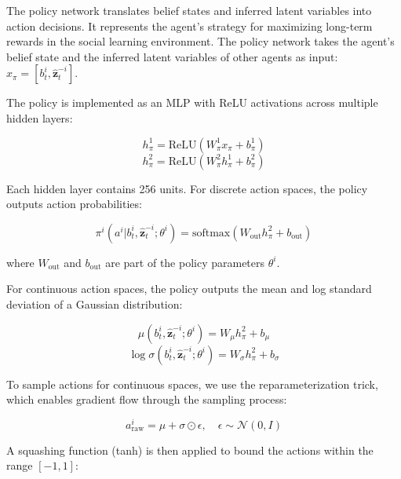 \documentclass[a4paper,12pt]{report}
\begin{document}
The policy network translates belief states and inferred latent variables into action decisions. It represents the agent's strategy for maximizing long-term rewards in the social learning environment. The policy network takes the agent's belief state and the inferred latent variables of other agents as input: $x_{\pi} = [b^{i}_{t}, \hat{\boldsymbol{z}}^{-i}_{t}]$.

The policy is implemented as an MLP with ReLU activations across multiple hidden layers:

\begin{equation}
    h^1_{\pi} = \text{ReLU}(W^1_{\pi}x_{\pi} + b^1_{\pi})
\end{equation}
\begin{equation}
    h^2_{\pi} = \text{ReLU}(W^2_{\pi}h^1_{\pi} + b^2_{\pi})
\end{equation}

Each hidden layer contains 256 units. For discrete action spaces, the policy outputs action probabilities:

\begin{equation}
    \pi^{i}(a^{i}|b^{i}_{t}, \hat{\boldsymbol{z}}^{-i}_{t}; \theta^{i}) = \text{softmax}(W_{\text{out}}h^2_{\pi} + b_{\text{out}})
\end{equation}

where $W_{\text{out}}$ and $b_{\text{out}}$ are part of the policy parameters $\theta^{i}$.

For continuous action spaces, the policy outputs the mean and log standard deviation of a Gaussian distribution:

\begin{equation}
    \mu(b^{i}_{t}, \hat{\boldsymbol{z}}^{-i}_{t}; \theta^{i}) = W_{\mu}h^2_{\pi} + b_{\mu}
\end{equation}
\begin{equation}
    \log\sigma(b^{i}_{t}, \hat{\boldsymbol{z}}^{-i}_{t}; \theta^{i}) = W_{\sigma}h^2_{\pi} + b_{\sigma}
\end{equation}

To sample actions for continuous spaces, we use the reparameterization trick, which enables gradient flow through the sampling process:

\begin{equation}
    a^i_{\text{raw}} = \mu + \sigma \odot \epsilon, \quad \epsilon \sim \mathcal{N}(0, I)
\end{equation}

A squashing function (tanh) is then applied to bound the actions within the range $[-1, 1]$:
\end{document}
